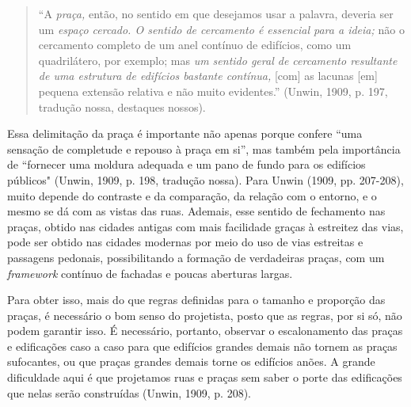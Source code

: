 \documentclass[12pt, a4paper]{book} %
\begin{document}
        \begin{quotation}
            ``A \textit{praça,} então, no sentido em que desejamos usar a palavra, deveria ser um \textit{espaço cercado. O sentido de cercamento é essencial para a ideia;} não o cercamento completo de um anel contínuo de edifícios, como um quadrilátero, por exemplo; mas \textit{um sentido geral de cercamento resultante de uma estrutura de edifícios bastante contínua,} [com] as lacunas [em] pequena extensão relativa e não muito evidentes.'' (Unwin, 1909, p. 197, tradução nossa, destaques nossos).
        \end{quotation}

        Essa delimitação da praça é importante não apenas porque confere ``uma sensação de completude e repouso à praça em si'', mas também pela importância de ``fornecer uma moldura adequada e um pano de fundo para os edifícios públicos" (Unwin, 1909, p. 198, tradução nossa). Para Unwin (1909, pp. 207-208), muito depende do contraste e da comparação, da relação com o entorno, e o mesmo se dá com as vistas das ruas. Ademais, esse sentido de fechamento nas praças, obtido nas cidades antigas com mais facilidade graças à estreitez das vias, pode ser obtido nas cidades modernas por meio do uso de vias estreitas e passagens pedonais, possibilitando a formação de verdadeiras praças, com um \textit{framework} contínuo de fachadas e poucas aberturas largas.

        Para obter isso, mais do que regras definidas para o tamanho e proporção das praças, é necessário o bom senso do projetista, posto que as regras, por si só, não podem garantir isso. É necessário, portanto, observar o escalonamento das praças e edificações caso a caso para que edifícios grandes demais não tornem as praças sufocantes, ou que praças grandes demais torne os edifícios anões. A grande dificuldade aqui é que projetamos ruas e praças sem saber o porte das edificações que nelas serão construídas (Unwin, 1909, p. 208).
\end{document}
